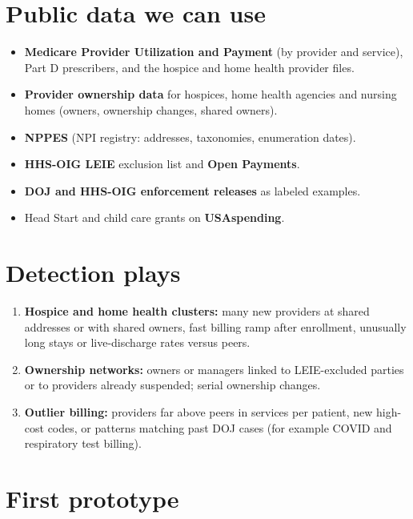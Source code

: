 \documentclass[letterpaper,11pt]{article}
\providecommand{\tightlist}{\setlength{\itemsep}{0pt}\setlength{\parskip}{0pt}}
\begin{document}
\hypertarget{public-data-we-can-use}{%
\section{Public data we can use}\label{public-data-we-can-use}}

\begin{itemize}
\tightlist
\item
  \textbf{Medicare Provider Utilization and Payment} (by provider and
  service), Part D prescribers, and the hospice and home health provider
  files.
\item
  \textbf{Provider ownership data} for hospices, home health agencies
  and nursing homes (owners, ownership changes, shared owners).
\item
  \textbf{NPPES} (NPI registry: addresses, taxonomies, enumeration
  dates).
\item
  \textbf{HHS-OIG LEIE} exclusion list and \textbf{Open Payments}.
\item
  \textbf{DOJ and HHS-OIG enforcement releases} as labeled examples.
\item
  Head Start and child care grants on \textbf{USAspending}.
\end{itemize}

\hypertarget{detection-plays}{%
\section{Detection plays}\label{detection-plays}}

\begin{enumerate}
\def\labelenumi{\arabic{enumi}.}
\tightlist
\item
  \textbf{Hospice and home health clusters:} many new providers at
  shared addresses or with shared owners, fast billing ramp after
  enrollment, unusually long stays or live-discharge rates versus peers.
\item
  \textbf{Ownership networks:} owners or managers linked to
  LEIE-excluded parties or to providers already suspended; serial
  ownership changes.
\item
  \textbf{Outlier billing:} providers far above peers in services per
  patient, new high-cost codes, or patterns matching past DOJ cases (for
  example COVID and respiratory test billing).
\end{enumerate}

\hypertarget{first-prototype}{%
\section{First prototype}\label{first-prototype}}
\end{document}
